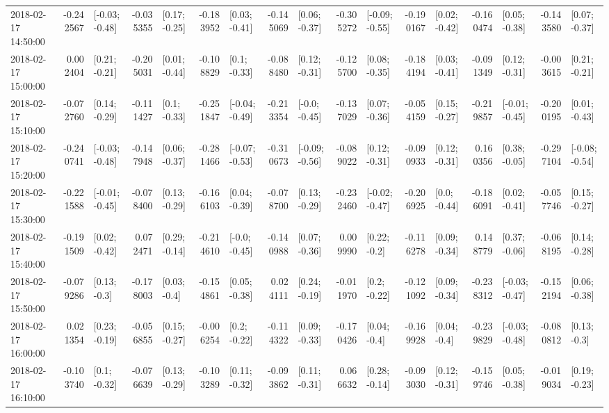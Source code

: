\begin{tabular}{lrlrlrlrlrlrlrlrl}
2018-02-17 14:50:00 & -0.242567 &  [-0.03; -0.48] & -0.035355 &   [0.17; -0.25] & -0.183952 &   [0.03; -0.41] & -0.145069 &   [0.06; -0.37] & -0.305272 &  [-0.09; -0.55] & -0.190167 &   [0.02; -0.42] & -0.160474 &   [0.05; -0.38] & -0.143580 &   [0.07; -0.37] \\
2018-02-17 15:00:00 &  0.002404 &   [0.21; -0.21] & -0.205031 &   [0.01; -0.44] & -0.108829 &    [0.1; -0.33] & -0.088480 &   [0.12; -0.31] & -0.125700 &   [0.08; -0.35] & -0.184194 &   [0.03; -0.41] & -0.091349 &   [0.12; -0.31] & -0.003615 &   [0.21; -0.21] \\
2018-02-17 15:10:00 & -0.072760 &   [0.14; -0.29] & -0.111427 &    [0.1; -0.33] & -0.251847 &  [-0.04; -0.49] & -0.213354 &   [-0.0; -0.45] & -0.137029 &   [0.07; -0.36] & -0.054159 &   [0.15; -0.27] & -0.219857 &  [-0.01; -0.45] & -0.200195 &   [0.01; -0.43] \\
2018-02-17 15:20:00 & -0.240741 &  [-0.03; -0.48] & -0.147948 &   [0.06; -0.37] & -0.281466 &  [-0.07; -0.53] & -0.310673 &  [-0.09; -0.56] & -0.089022 &   [0.12; -0.31] & -0.090933 &   [0.12; -0.31] &  0.160356 &   [0.38; -0.05] & -0.297104 &  [-0.08; -0.54] \\
2018-02-17 15:30:00 & -0.221588 &  [-0.01; -0.45] & -0.078400 &   [0.13; -0.29] & -0.166103 &   [0.04; -0.39] & -0.078700 &   [0.13; -0.29] & -0.232460 &  [-0.02; -0.47] & -0.206925 &    [0.0; -0.44] & -0.186091 &   [0.02; -0.41] & -0.057746 &   [0.15; -0.27] \\
2018-02-17 15:40:00 & -0.191509 &   [0.02; -0.42] &  0.072471 &   [0.29; -0.14] & -0.214610 &   [-0.0; -0.45] & -0.140988 &   [0.07; -0.36] &  0.009990 &    [0.22; -0.2] & -0.116278 &   [0.09; -0.34] &  0.148779 &   [0.37; -0.06] & -0.068195 &   [0.14; -0.28] \\
2018-02-17 15:50:00 & -0.079286 &    [0.13; -0.3] & -0.178003 &    [0.03; -0.4] & -0.154861 &   [0.05; -0.38] &  0.024111 &   [0.24; -0.19] & -0.011970 &    [0.2; -0.22] & -0.121092 &   [0.09; -0.34] & -0.238312 &  [-0.03; -0.47] & -0.152194 &   [0.06; -0.38] \\
2018-02-17 16:00:00 &  0.021354 &   [0.23; -0.19] & -0.056855 &   [0.15; -0.27] & -0.006254 &    [0.2; -0.22] & -0.114322 &   [0.09; -0.33] & -0.170426 &    [0.04; -0.4] & -0.169928 &    [0.04; -0.4] & -0.239829 &  [-0.03; -0.48] & -0.080812 &    [0.13; -0.3] \\
2018-02-17 16:10:00 & -0.103740 &    [0.1; -0.32] & -0.076639 &   [0.13; -0.29] & -0.103289 &   [0.11; -0.32] & -0.093862 &   [0.11; -0.31] &  0.066632 &   [0.28; -0.14] & -0.093030 &   [0.12; -0.31] & -0.159746 &   [0.05; -0.38] & -0.019034 &   [0.19; -0.23] \\

\end{tabular}
